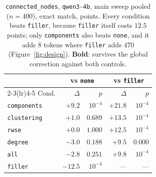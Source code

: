 \begin{table}[t]\centering\small
\begin{tabular}{lrrrr}
\toprule
& \multicolumn{2}{c}{vs \texttt{none}} & \multicolumn{2}{c}{vs \texttt{filler}} \\
\cmidrule(lr){2-3}\cmidrule(lr){4-5}
Cond. & $\Delta$ & $p$ & $\Delta$ & $p$ \\
\midrule
\texttt{components} & $\mathbf{+9.2}$ & $10^{-4}$ & $\mathbf{+21.8}$ & $10^{-4}$ \\
\texttt{clustering} & $+1.0$ & $0.689$ & $+13.5$ & $10^{-4}$ \\
\texttt{rwse} & $+0.0$ & $1.000$ & $+12.5$ & $10^{-4}$ \\
\texttt{degree} & $-3.0$ & $0.188$ & $+9.5$ & $0.000$ \\
\texttt{all} & $-2.8$ & $0.251$ & $+9.8$ & $10^{-4}$ \\
\texttt{filler} & $-12.5$ & $10^{-4}$ & --- & --- \\
\bottomrule
\end{tabular}
\caption{\texttt{connected\_nodes}, \texttt{qwen3-4b}, main sweep pooled ($n{=}400$), exact match, points. Every condition beats \texttt{filler}, because \texttt{filler} itself costs $12.5$ points; only \texttt{components} also beats \texttt{none}, and it adds $8$ tokens where \texttt{filler} adds $470$ (Figure~\ref{fig:design}). \textbf{Bold}: survives the global correction against both controls.}
\label{tab:cncontrols}
\end{table}
